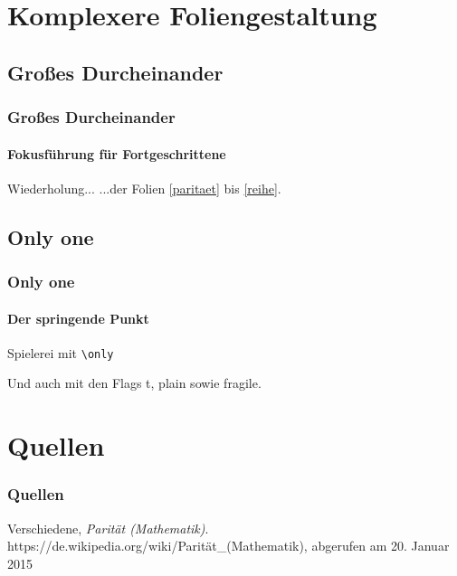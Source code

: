 \documentclass[ngerman]{beamer}
\begin{document}
\section{Komplexere Foliengestaltung}
\subsection{Großes Durcheinander}
\begin{frame}
  \frametitle{Großes Durcheinander}
  \framesubtitle{Fokusführung für Fortgeschrittene}
  \begin{block}{Wiederholung...}
    ...der Folien \ref{paritaet} bis \ref{reihe}.
  \end{block}
\end{frame}

\subsection{Only one}
\begin{frame}
  \frametitle{Only one}
  \framesubtitle{Der springende Punkt}
  Spielerei mit \verb:\only:


  Und auch mit den Flags t, plain sowie fragile.
\end{frame}

\section{Quellen}
\begin{frame}
  \frametitle{Quellen}
  \begin{thebibliography}{9}
      Verschiedene,
      \emph{Parität (Mathematik)}.\\
      https://de.wikipedia.org/wiki/Parität\_(Mathematik),
      abgerufen am 20. Januar 2015
  \end{thebibliography}
\end{frame}
\end{document}
